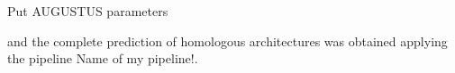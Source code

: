 \documentclass[11pt]{article}
\newcommand{\TODO}[1]{\begingroup\color{red}#1\endgroup}
\begin{document}
\TODO{Put AUGUSTUS parameters}

and the complete prediction of homologous architectures was obtained applying 
the pipeline \TODO{Name of my pipeline!}.




\end{document}
